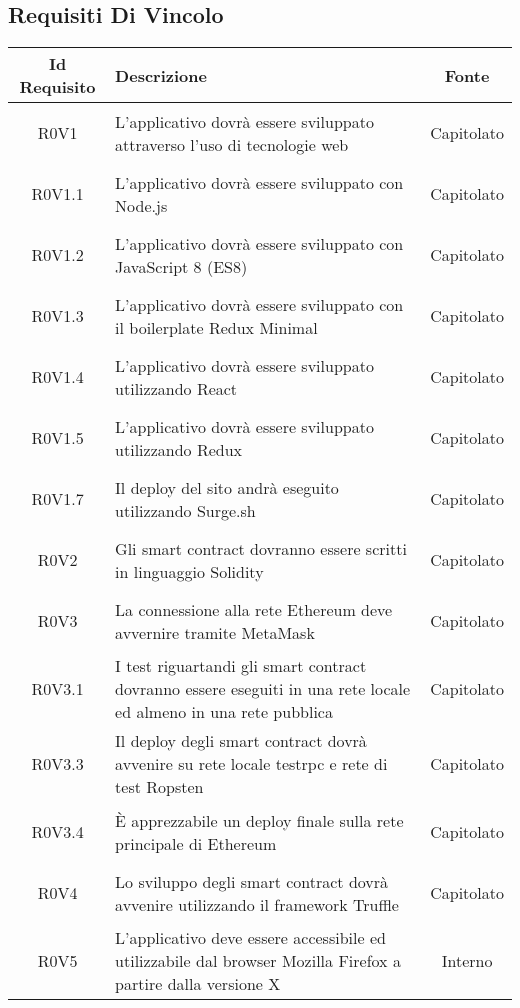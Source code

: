 \subsection{Requisiti Di Vincolo}
\normalsize
\begin{longtable}{|c|>{\centering}m{7cm}|c|}
\hline
\textbf{Id Requisito} & \textbf{Descrizione} & \textbf{Fonte}\\
\hline
\endhead
\hypertarget{R0V1}{R0V1} & L'applicativo dovrà essere sviluppato attraverso l'uso di tecnologie web & Capitolato \\ \hline 
\hypertarget{R0V1.1}{R0V1.1} & L'applicativo dovrà essere sviluppato con Node.js & Capitolato \\ \hline 
\hypertarget{R0V1.2}{R0V1.2} & L'applicativo dovrà essere sviluppato con JavaScript 8 (ES8) & Capitolato \\ \hline 
\hypertarget{R0V1.3}{R0V1.3} & L'applicativo dovrà essere sviluppato con il boilerplate Redux Minimal & Capitolato \\ \hline 
\hypertarget{R0V1.4}{R0V1.4} & L'applicativo dovrà essere sviluppato utilizzando React & Capitolato \\ \hline 
\hypertarget{R0V1.5}{R0V1.5} & L'applicativo dovrà essere sviluppato utilizzando Redux & Capitolato \\ \hline 
\hypertarget{R0V1.7}{R0V1.7} & Il deploy del sito andrà eseguito utilizzando Surge.sh & Capitolato \\ \hline 
\hypertarget{R0V2}{R0V2} & Gli smart contract dovranno essere scritti in linguaggio Solidity & Capitolato \\ \hline 
\hypertarget{R0V3}{R0V3} & La connessione alla rete Ethereum deve avvernire tramite MetaMask & Capitolato \\ \hline 
\hypertarget{R0V3.1}{R0V3.1} & I test riguartandi gli smart contract dovranno essere eseguiti in una rete locale ed almeno in una rete pubblica & Capitolato \\ \hline 
\hypertarget{R0V3.3}{R0V3.3} & Il deploy degli smart contract dovrà avvenire su rete locale testrpc e rete di test Ropsten & Capitolato \\ \hline 
\hypertarget{R0V3.4}{R0V3.4} & È apprezzabile un deploy finale sulla rete principale di Ethereum & Capitolato \\ \hline 
\hypertarget{R0V4}{R0V4} & Lo sviluppo degli smart contract dovrà avvenire utilizzando il framework Truffle & Capitolato \\ \hline 
\hypertarget{R0V5}{R0V5} & L'applicativo deve essere accessibile ed utilizzabile dal browser Mozilla Firefox a partire dalla versione X & Interno \\ \hline 

\end{longtable}
